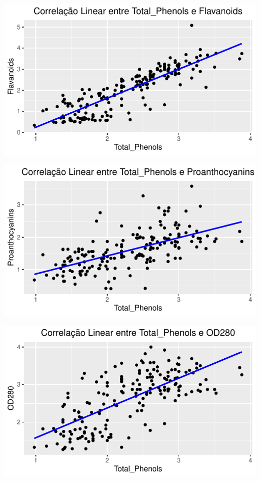 \documentclass[
  letterpaper,
  DIV=11,
  numbers=noendperiod]{scrartcl}
\begin{document}
\begin{center}
\includegraphics{wines_analysis_files/figure-pdf/unnamed-chunk-10-1.pdf}
\end{center}

\begin{center}
\includegraphics{wines_analysis_files/figure-pdf/unnamed-chunk-10-2.pdf}
\end{center}

\begin{center}
\includegraphics{wines_analysis_files/figure-pdf/unnamed-chunk-10-3.pdf}
\end{center}
\end{document}

